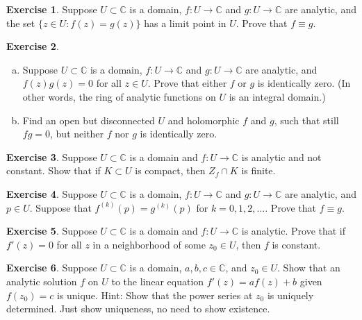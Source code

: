 \documentclass[12pt,openany]{book}
\newcommand{\C}{{\mathbb{C}}}
\theoremstyle{plain}
\theoremstyle{remark}
\theoremstyle{definition}
\newenvironment{exbox}{%
    \def\FrameCommand{\vrule width 1pt \relax\hspace{10pt}}%
    \MakeFramed{\advance\hsize-\width\FrameRestore}%
}{%
    \endMakeFramed
}
\newenvironment{exparts}{%
    \leavevmode\begin{enumerate}[a),noitemsep,topsep=0pt,parsep=0pt,partopsep=0pt]
}{%
    \end{enumerate}
}
\theoremstyle{exercise}
\newtheorem{exercise}{Exercise}[section]
\theoremstyle{example}
\begin{document}
\begin{exbox}
\begin{exercise}
Suppose $U \subset \C$ is a domain,
$f \colon U \to \C$ and $g \colon U \to \C$ are analytic,
and the set $\bigl\{ z \in U : f(z) = g(z) \bigr\}$ has a limit
point in $U$.
Prove that $f \equiv g$.
\end{exercise}

\begin{exercise}
\begin{exparts}
\item
Suppose $U \subset \C$ is a domain,
$f \colon U \to \C$ and $g \colon U \to \C$ are analytic,
and $f(z)g(z) = 0$ for all $z \in U$.
Prove that either $f$ or $g$ is identically zero.
(In other words, the ring of analytic functions on $U$ is an integral
domain.)
\item
Find an open but disconnected $U$ and holomorphic $f$ and $g$,
such that still $fg = 0$, but neither $f$ nor $g$ is identically zero.
\end{exparts}
\end{exercise}

\begin{exercise}
Suppose $U \subset \C$ is a domain and $f \colon U \to \C$ is
analytic and not constant.  Show that if $K \subset U$ is compact,
then $Z_f \cap K$ is finite.
\end{exercise}

\begin{exercise}
Suppose $U \subset \C$ is a domain, $f \colon U \to \C$ and $g \colon U \to
\C$ are analytic, and $p \in U$.  Suppose that $f^{(k)}(p) = g^{(k)}(p)$
for $k=0,1,2,\ldots$.  Prove that $f \equiv g$.
\end{exercise}

\begin{exercise}
Suppose $U \subset \C$ is a domain and $f \colon U \to \C$ is analytic.
Prove that if $f'(z) = 0$ for
all $z$ in a neighborhood of some $z_0 \in U$, then $f$ is constant.
\end{exercise}

\begin{exercise}
Suppose $U \subset \C$ is a domain, $a, b, c \in \C$, and $z_0 \in U$.
Show that
an analytic solution $f$ on $U$ to the linear equation $f'(z) = a f(z) + b$
given $f(z_0) = c$ is unique.  Hint: Show that the power series at $z_0$ is uniquely
determined.  Just show uniqueness, no need to show existence.
\end{exercise}
\end{exbox}
\end{document}
